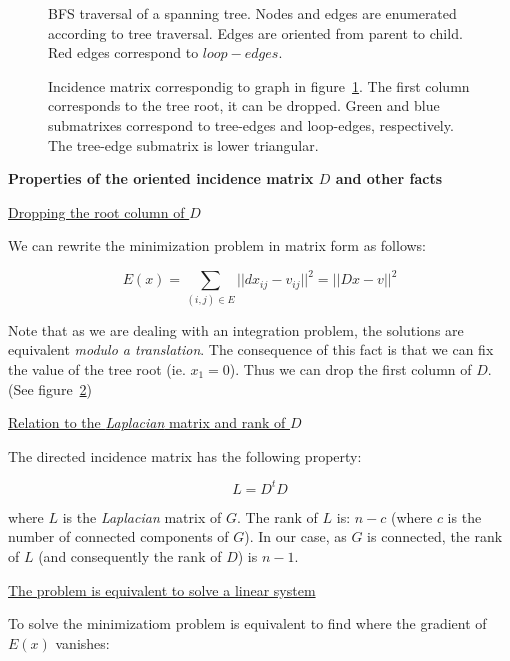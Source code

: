 \documentclass[a4paper,11pt]{article}
\begin{document}
\begin{figure}
\centering

\caption{BFS traversal of a spanning tree. Nodes and edges are 
enumerated according to tree traversal. Edges are oriented from 
parent to child. Red edges correspond to 
$loop-edges$.}
\label{fig:M1}
\end{figure}

\begin{figure}
\centering

\caption{Incidence matrix correspondig to graph in figure~\ref{fig:M1}. 
The first column corresponds to the tree root, it can be dropped. 
Green and blue submatrixes correspond to tree-edges and loop-edges, 
respectively. The tree-edge submatrix is lower triangular.}
\label{fig:M2}
\end{figure}

\newpage

\textbf{Properties of the oriented incidence matrix $D$ and other facts}

\bigskip

\underline{Dropping the root column of $D$}

\bigskip

We can rewrite the minimization problem in matrix form as follows:

$$E(x) = \sum_{(i,j) \in E} ||dx_{ij} - v_{ij}||^2 = || D x - v||^2$$

Note that as we are dealing with an integration problem, the solutions 
are equivalent \textit{modulo a translation}. The consequence of this 
fact is that we can fix the value of the tree root (ie. $x_1 = 0$). 
Thus we can drop the first column of $D$. (See 
figure~\ref{fig:M2})

\bigskip

\underline{Relation to the \textit{Laplacian} matrix and rank of $D$}

\bigskip

The directed incidence matrix has the following property:

$$L = D^t D$$

where $L$ is the \textit{Laplacian} matrix of $G$. The rank of 
$L$ is: $n-c$ (where $c$ is the number of connected components of $G$). 
In our case, as $G$ is connected, the rank of $L$ (and consequently the 
rank of $D$) is $n-1$.

\bigskip

\underline{The problem is equivalent to solve a linear system}

\bigskip

To solve the minimizatiom problem is equivalent to find where the 
gradient of $E(x)$ vanishes:
 
\end{document}
